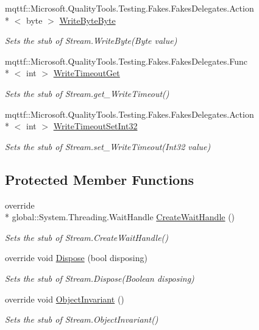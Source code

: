 \begin{DoxyCompactItemize}
mqttf\-::\-Microsoft.\-Quality\-Tools.\-Testing.\-Fakes.\-Fakes\-Delegates.\-Action\\*
$<$ byte $>$ \hyperlink{class_system_1_1_i_o_1_1_fakes_1_1_stub_stream_aeb22e11cc925879d2536f0aef9d4fb6e}{Write\-Byte\-Byte}
\begin{DoxyCompactList}\small\item\em Sets the stub of Stream.\-Write\-Byte(\-Byte value)\end{DoxyCompactList}\item 
mqttf\-::\-Microsoft.\-Quality\-Tools.\-Testing.\-Fakes.\-Fakes\-Delegates.\-Func\\*
$<$ int $>$ \hyperlink{class_system_1_1_i_o_1_1_fakes_1_1_stub_stream_aad365d54a4cce302980f8e71bc546a57}{Write\-Timeout\-Get}
\begin{DoxyCompactList}\small\item\em Sets the stub of Stream.\-get\-\_\-\-Write\-Timeout()\end{DoxyCompactList}\item 
mqttf\-::\-Microsoft.\-Quality\-Tools.\-Testing.\-Fakes.\-Fakes\-Delegates.\-Action\\*
$<$ int $>$ \hyperlink{class_system_1_1_i_o_1_1_fakes_1_1_stub_stream_a75146ba4bc1eadfc3214d052a72567cb}{Write\-Timeout\-Set\-Int32}
\begin{DoxyCompactList}\small\item\em Sets the stub of Stream.\-set\-\_\-\-Write\-Timeout(\-Int32 value)\end{DoxyCompactList}\end{DoxyCompactItemize}
\subsection*{Protected Member Functions}
\begin{DoxyCompactItemize}
\item 
override \\*
global\-::\-System.\-Threading.\-Wait\-Handle \hyperlink{class_system_1_1_i_o_1_1_fakes_1_1_stub_stream_adb530ba3b3bbd8f8a9a4985e97394334}{Create\-Wait\-Handle} ()
\begin{DoxyCompactList}\small\item\em Sets the stub of Stream.\-Create\-Wait\-Handle()\end{DoxyCompactList}\item 
override void \hyperlink{class_system_1_1_i_o_1_1_fakes_1_1_stub_stream_a634097c19b350678e563f7e2641eb878}{Dispose} (bool disposing)
\begin{DoxyCompactList}\small\item\em Sets the stub of Stream.\-Dispose(\-Boolean disposing)\end{DoxyCompactList}\item 
override void \hyperlink{class_system_1_1_i_o_1_1_fakes_1_1_stub_stream_af8e68e09d88520c88748405313db9f6d}{Object\-Invariant} ()
\begin{DoxyCompactList}\small\item\em Sets the stub of Stream.\-Object\-Invariant()\end{DoxyCompactList}\end{DoxyCompactItemize}

